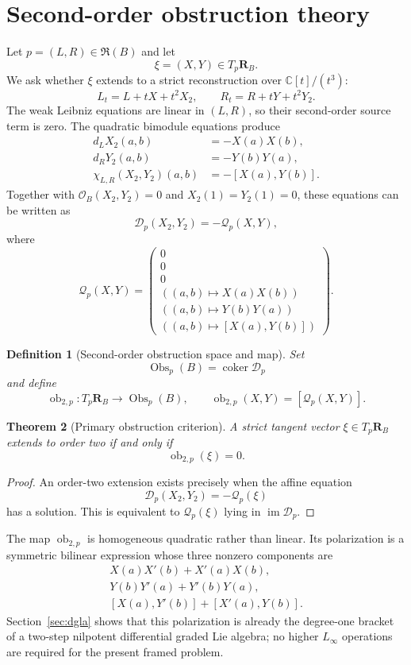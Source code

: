 \documentclass[11pt]{amsart}
\newtheorem{theorem}{Theorem}[section]
\newtheorem{definition}[theorem]{Definition}
\newcommand{\coker}{\operatorname{coker}}
\newcommand{\Obs}{\operatorname{Obs}}
\newcommand{\Rfib}{\mathfrak R}
\newcommand{\cO}{\mathcal O}
\newcommand{\cD}{\mathscr D}
\newcommand{\cQ}{\mathscr Q}
\newcommand{\C}{\mathbb C}
\begin{document}
\section{Second-order obstruction theory}

Let $p=(L,R)\in\Rfib(B)$ and let
\[
\xi=(X,Y)\in T_p\mathbf R_B.
\]
We ask whether $\xi$ extends to a strict reconstruction over $\C[t]/(t^3)$:
\[
L_t=L+tX+t^2X_2,
\qquad
R_t=R+tY+t^2Y_2.
\]
The weak Leibniz equations are linear in $(L,R)$, so their second-order source term is zero.  The quadratic bimodule equations produce
\begin{align}
d_LX_2(a,b)&=-X(a)X(b), \label{eq:second-left}\\
d_RY_2(a,b)&=-Y(b)Y(a), \label{eq:second-right}\\
\chi_{L,R}(X_2,Y_2)(a,b)&=-[X(a),Y(b)]. \label{eq:second-comm}
\end{align}
Together with $\cO_B(X_2,Y_2)=0$ and $X_2(1)=Y_2(1)=0$, these equations can be written as
\[
\cD_p(X_2,Y_2)=-\cQ_p(X,Y),
\]
where
\[
\cQ_p(X,Y)=
\begin{pmatrix}
0\\0\\0\\
((a,b)\mapsto X(a)X(b))\\
((a,b)\mapsto Y(b)Y(a))\\
((a,b)\mapsto [X(a),Y(b)])
\end{pmatrix}.
\]

\begin{definition}[Second-order obstruction space and map]
Set
\[
\Obs_p(B)=\coker\cD_p
\]
and define
\[
\operatorname{ob}_{2,p}:T_p\mathbf R_B\longrightarrow\Obs_p(B),
\qquad
\operatorname{ob}_{2,p}(X,Y)=[\cQ_p(X,Y)].
\]
\end{definition}

\begin{theorem}[Primary obstruction criterion]\label{thm:obstruction}
A strict tangent vector $\xi\in T_p\mathbf R_B$ extends to order two if and only if
\[
\operatorname{ob}_{2,p}(\xi)=0.
\]
\end{theorem}

\begin{proof}
An order-two extension exists precisely when the affine equation
\[
\cD_p(X_2,Y_2)=-\cQ_p(\xi)
\]
has a solution.  This is equivalent to $\cQ_p(\xi)$ lying in $\operatorname{im}\cD_p$.
\end{proof}

The map $\operatorname{ob}_{2,p}$ is homogeneous quadratic rather than linear.  Its polarization is a symmetric bilinear expression whose three nonzero components are
\begin{align*}
X(a)X'(b)+X'(a)X(b),\\
Y(b)Y'(a)+Y'(b)Y(a),\\
[X(a),Y'(b)]+[X'(a),Y(b)].
\end{align*}
Section~\ref{sec:dgla} shows that this polarization is already the degree-one bracket of a two-step nilpotent differential graded Lie algebra; no higher $L_\infty$ operations are required for the present framed problem.
\end{document}
